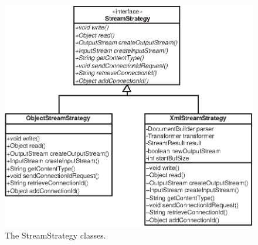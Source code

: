 \documentclass{article}
\begin{document}
\begin{figure}[!hbp]
\includegraphics{strat.eps}
\caption{The StreamStrategy classes.} \label{strat}
\end{figure}
\end{document}
